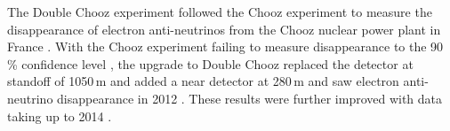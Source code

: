 The Double Chooz experiment followed the Chooz experiment to measure the disappearance of electron anti-neutrinos from the Chooz nuclear power plant in France \cite{lasserre2006}. With the Chooz experiment failing to measure disappearance to the 90\,\% confidence level \cite{Apollonio_2003}, the upgrade to Double Chooz replaced the detector at standoff of 1050\,m and added a near detector at 280\,m and saw electron anti-neutrino disappearance in 2012 \cite{Abe_2012}. These results were further improved with data taking up to 2014 \cite{abe2014improved}.

